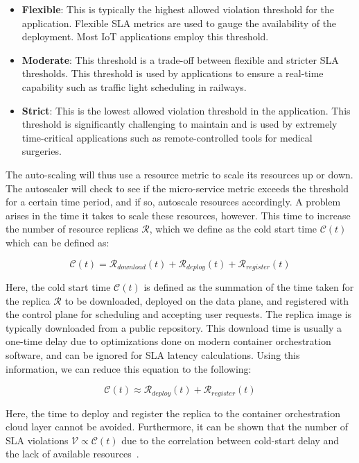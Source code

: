 \begin{itemize}
    \item \textbf{Flexible}: This is typically the highest allowed violation threshold for the application. Flexible SLA metrics are used to gauge the availability of the deployment. Most IoT applications employ this threshold.
    \item \textbf{Moderate}: This threshold is a trade-off between flexible and stricter SLA thresholds. This threshold is used by applications to ensure a real-time capability such as traffic light scheduling in railways.
    \item \textbf{Strict}: This is the lowest allowed violation threshold in the application. This threshold is significantly challenging to maintain and is used by extremely time-critical applications such as remote-controlled tools for medical surgeries.
\end{itemize}

The auto-scaling will thus use a resource metric to scale its resources up or down. The autoscaler will check to see if the micro-service metric exceeds the threshold for a certain time period, and if so, autoscale resources accordingly. A problem arises in the time it takes to scale these resources, however. This time to increase the number of resource replicas $\mathcal{R}$, which we define as the cold start time $\mathcal{C}(t)$ which can be defined as:

\begin{equation}
    \mathcal{C}(t) = \mathcal{R}_{download}(t) + \mathcal{R}_{deploy}(t) + \mathcal{R}_{register}(t)
\end{equation}

Here, the cold start time $\mathcal{C}(t)$ is defined as the summation of the time taken for the replica $\mathcal{R}$ to be downloaded, deployed on the data plane, and registered with the control plane for scheduling and accepting user requests. The replica image is typically downloaded from a public repository. This download time is usually a one-time delay due to optimizations done on modern container orchestration software, and can be ignored for SLA latency calculations. Using this information, we can reduce this equation to the following:

\begin{equation}
    \mathcal{C}(t) \approx \mathcal{R}_{deploy}(t) + \mathcal{R}_{register}(t)
\end{equation}


Here, the time to deploy and register the replica to the container orchestration cloud layer cannot be avoided. Furthermore, it can be shown that the number of SLA violations $\mathcal{V} \propto \mathcal{C}(t)$ due to the correlation between cold-start delay and the lack of available resources~\cite{patel2021systematic}.\par

